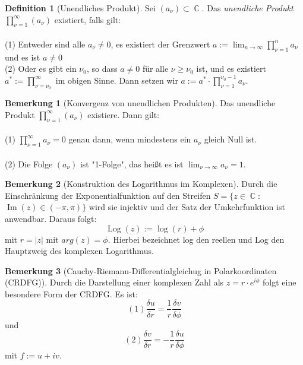 \documentclass[10pt,a4paper]{article}
\theoremstyle{plain}
\theoremstyle{definition}
\newtheorem{defn}{Definition}[section]
\newtheorem*{note}{Bemerkung}
\theoremstyle{remark}
\DeclareMathOperator{\C}{\mathbb{C}}
\DeclareMathOperator{\im}{Im}
\DeclareMathOperator{\Log}{Log}
\begin{document}
\begin{defn}[Unendliches Produkt]
Sei $(a_{\nu})\subset \C$. Das \textit{unendliche Produkt} $\prod_{\nu = 1 }^{\infty}(a_{\nu})$ existiert, falls gilt:
\\
\\
(1) Entweder sind alle $a_{\nu}\neq 0$, es existiert der Grenzwert $ a := \lim_{n \to \infty} \prod_{\nu = 1}^{n} a_{\nu}$ und es ist $a \neq 0$
\\
(2) Oder es gibt ein $\nu_{0}$, so dass $a \neq 0$ für alle $\nu \geq \nu_{0}$ ist, und es existiert $a^{*} := \prod_{\nu = \nu_{0}}^{\infty}$ im obigen Sinne. Dann setzen wir $a := a^{*} 
\cdot \prod_{\nu = 1}^{\nu_{0} - 1}a_{\nu}$.

\end{defn}

\begin{note}[Konvergenz von unendlichen Produkten]

Das unendliche Produkt $\prod_{\nu = 1 }^{\infty}(a_{\nu})$ existiere. Dann gilt:
\\
\\
(1) $\prod_{\nu = 1}^{\infty}a_{\nu} = 0$ genau dann, wenn mindestens ein $a_{\nu}$ gleich Null ist.
\\
\\
(2) Die Folge $(a_{\nu})$ ist "1-Folge", das heißt es ist $\lim_{\nu \rightarrow\infty}a_{\nu} = 1$.

\end{note}

\begin{note}[Konstruktion des Logarithmus im Komplexen]

Durch die \\Einschränkung der Exponentialfunktion auf den Streifen $S = \{ z \in \C : $\\$\im(z) \in (-\pi, \pi)\}$ wird sie injektiv und der Satz der Umkehrfunktion ist anwendbar. Daraus folgt:$$\Log(z) := \log(r) + \phi$$ mit $r=|z|$ mit $arg(z)= \phi$. Hierbei bezeichnet log den reellen und Log den Hauptzweig des komplexen Logarithmus.

\end{note}

\begin{note}[Cauchy-Riemann-Differentialgleichug in Polarkoordinaten (CRDFG)]

Durch die Darstellung einer komplexen Zahl als $z = r\cdot e^{i\phi}$ folgt eine besondere Form der CRDFG. Es ist: $$(1) \frac{\delta u}{\delta r} = \frac{1}{r} \frac{\delta v}{\delta \phi}$$ und $$(2)\frac{\delta v}{\delta r} = -\frac{1}{r} \frac{\delta u}{\delta \phi}$$ mit $f := u + iv$.

\end{note}
\end{document}
